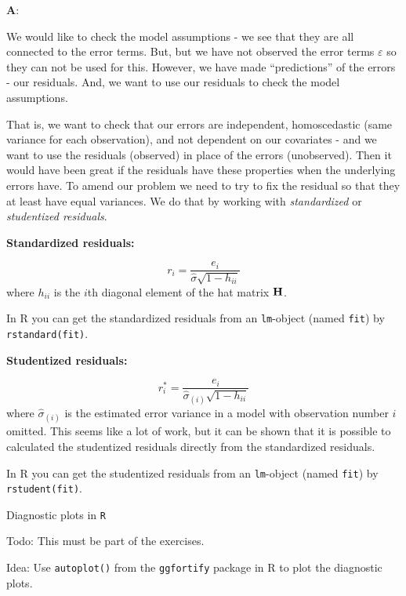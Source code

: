 \documentclass[10pt,ignorenonframetext,]{beamer}
\begin{document}
\begin{frame}

\textbf{A}:

We would like to check the model assumptions - we see that they are all
connected to the error terms. But, but we have not observed the error
terms \(\varepsilon\) so they can not be used for this. However, we have
made ``predictions'' of the errors - our residuals. And, we want to use
our residuals to check the model assumptions.

That is, we want to check that our errors are independent, homoscedastic
(same variance for each observation), and not dependent on our
covariates - and we want to use the residuals (observed) in place of the
errors (unobserved). Then it would have been great if the residuals have
these properties when the underlying errors have. To amend our problem
we need to try to fix the residual so that they at least have equal
variances. We do that by working with \emph{standardized} or
\emph{studentized residuals}.

\end{frame}

\begin{frame}[fragile]

\textbf{Standardized residuals:}

\[r_i=\frac{e_i}{\hat{\sigma}\sqrt{1-h_{ii}}}\] where \(h_{ii}\) is the
\(i\)th diagonal element of the hat matrix \({\bf H}\).

In R you can get the standardized residuals from an \texttt{lm}-object
(named \texttt{fit}) by \texttt{rstandard(fit)}.

\textbf{Studentized residuals:}

\[r^*_i=\frac{e_i}{\hat{\sigma}_{(i)}\sqrt{1-h_{ii}}}\] where
\(\hat{\sigma}_{(i)}\) is the estimated error variance in a model with
observation number \(i\) omitted. This seems like a lot of work, but it
can be shown that it is possible to calculated the studentized residuals
directly from the standardized residuals.

In R you can get the studentized residuals from an \texttt{lm}-object
(named \texttt{fit}) by \texttt{rstudent(fit)}.

\end{frame}

\begin{frame}[fragile]

\begin{block}{Diagnostic plots in \texttt{R}}

Todo: This must be part of the exercises.

Idea: Use \texttt{autoplot()} from the \texttt{ggfortify} package in R
to plot the diagnostic plots.

\end{block}

\end{frame}
\end{document}
